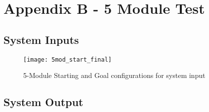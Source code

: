 \newpage
\section{Appendix B - 5 Module Test}
\subsection{System Inputs}
\begin{figure}[h]
	\centering
	\texttt{[image: 5mod\_start\_final]}
	\caption{5-Module Starting and Goal configurations for system input}
	\label{5mod_start_goal}
\end{figure}

\subsection{System Output}
\inputminted[fontsize=\footnotesize]{python}{appendices/moduleTestOutput.txt}
